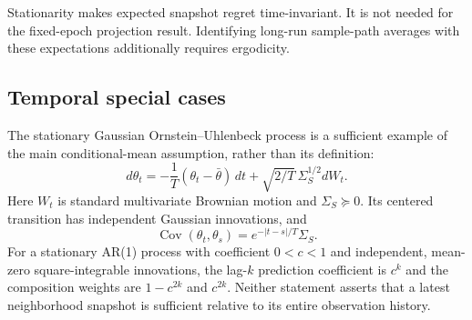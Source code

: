 Stationarity makes expected snapshot regret time-invariant. It is not needed
for the fixed-epoch projection result. Identifying long-run sample-path
averages with these expectations additionally requires ergodicity.

\subsection{Temporal special cases}
\label{app:temporal-special-cases}
The stationary Gaussian Ornstein--Uhlenbeck process is a sufficient example
of the main conditional-mean assumption, rather than its definition:
\begin{equation}
d\theta_t=-\frac1T(\theta_t-\bar\theta)\,dt
+\sqrt{2/T}\,\Sigma_S^{1/2}dW_t.
\label{eq:OU_process}
\end{equation}
Here $W_t$ is standard multivariate Brownian motion and $\Sigma_S\succeq0$.
Its centered transition has independent Gaussian innovations, and
\begin{equation}
\operatorname{Cov}(\theta_t,\theta_s)=e^{-|t-s|/T}\Sigma_S.
\label{eq:separable_space_time_covariance}
\end{equation}
For a stationary AR(1) process with coefficient $0<c<1$ and independent,
mean-zero square-integrable innovations, the lag-$k$ prediction coefficient
is $c^k$ and the composition weights are $1-c^{2k}$ and $c^{2k}$.
Neither statement asserts that a latest neighborhood snapshot is sufficient
relative to its entire observation history.

